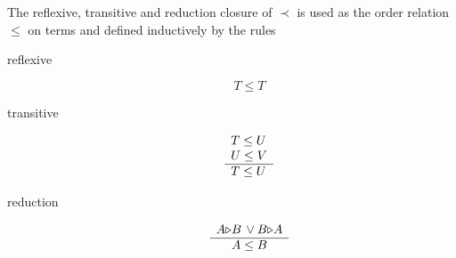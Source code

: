 \begin{definition}
  The reflexive, transitive and reduction closure of $\prec$ is used as the
  order relation $\le$ on terms and defined inductively by the rules
  \begin{description}
  \item[reflexive]
    $$
    T \le T
    $$

  \item[transitive]
    $$
    \begin{array}{l} T \le U \\ U \le V \\ \hline T \le U\end{array}
    $$

  \item[reduction]
    $$
    \begin{array}{c} A {\mathrel{\triangleright}} B \, \lor B {\mathrel{\triangleright}} A \\ \hline A \le B\end{array}
    $$
  \end{description}
\end{definition}



